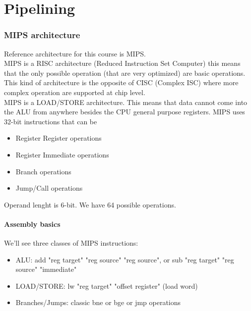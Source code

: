 \documentclass[10pt,a4paper]{article}
\begin{document}
	\clearpage \part{Pipelining}
		\section{MIPS architecture}
			Reference architecture for this course is MIPS.\\
			MIPS is a RISC architecture (Reduced Instruction Set Computer) this means that the only possible operation (that are very optimized) are basic operations. This kind of architecture is the opposite of CISC (Complex ISC) where more complex operation are supported at chip level.\\
			MIPS is a LOAD/STORE architecture. This means that data cannot come into the ALU from anywhere besides the CPU general purpose registers. MIPS uses 32-bit instructions that can be
			\begin{itemize}
				\item Register Register operations
				\item Register Immediate operations
				\item Branch operations
				\item Jump/Call operations
			\end{itemize}
			Operand lenght is 6-bit. We have 64 possible operations.\\
			
			\subsection{Assembly basics}
				We'll see three classes of MIPS instructions:
				\begin{itemize}
					\item ALU: add "reg target" "reg source" "reg source", or sub "reg target" "reg source" "immediate"
					\item LOAD/STORE: lw "reg target" "offset register" (load word)
					\item Branches/Jumps: classic bne or bge or jmp operations
				\end{itemize}
			
\end{document}
